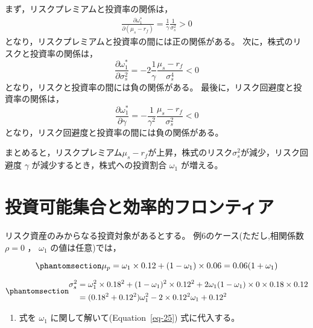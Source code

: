 \documentclass[
  letterpaper,
  pandoc,
  ja=standard,
  jafont = hiragino-pron]{ltjsbook}
\providecommand{\tightlist}{%
  \setlength{\itemsep}{0pt}\setlength{\parskip}{0pt}}\usepackage{longtable,booktabs,array}
\begin{document}
まず，リスクプレミアムと投資率の関係は， \[
\begin{aligned}
\frac{\partial \omega _1^*}{\partial (\mu_s - r_f)} = \frac{1}{\gamma }\frac{1}{\sigma _s^2} > 0
\end{aligned}
\] となり，リスクプレミアムと投資率の間には正の関係がある。
次に，株式のリスクと投資率の関係は， \[
\frac{\partial \omega _1^*}{\partial \sigma ^2_s} = -2 \frac{1}{\gamma }\frac{\mu_s -r_f }{\sigma _s^4} < 0
\] となり，リスクと投資率の間には負の関係がある。
最後に，リスク回避度と投資率の関係は， \[
\frac{\partial \omega _1^*}{\partial \gamma} = - \frac{1}{\gamma^2 }\frac{\mu_s -r_f }{\sigma _s^2} < 0
\] となり，リスク回避度と投資率の間には負の関係がある。

まとめると，リスクプレミアム\(\mu_s-r_f\)が上昇，株式のリスク\(\sigma_s^2\)が減少，リスク回避度
\(\gamma\) が減少するとき，株式への投資割合 \(\omega _1\) が増える。

\section{投資可能集合と効率的フロンティア}\label{ux6295ux8cc7ux53efux80fdux96c6ux5408ux3068ux52b9ux7387ux7684ux30d5ux30edux30f3ux30c6ux30a3ux30a2}

リスク資産のみからなる投資対象があるとする。 例6のケース(ただし,相関係数
\(\rho =0\) ， \(\omega _1\) の値は任意)では，

\begin{equation}\phantomsection\label{eq-24}{
\mu _p = \omega _1 \times 0.12 + (1-\omega _1)\times 0.06 = 0.06(1+\omega _1)
}\end{equation}

\begin{equation}\phantomsection\label{eq-25}{
\begin{aligned}
\sigma_s^2 &= \omega _1^2 \times 0.18^2 +(1-\omega _1)^2 \times 0.12^2 + 2 \omega _1(1-\omega _1) \times 0 \times 0.18 \times 0.12 \nonumber \\
           &=(0.18^2 + 0.12^2)\omega _1^2 - 2 \times 0.12 ^2 \omega _1 + 0.12^2
\end{aligned}
}\end{equation}

\begin{enumerate}
\def\labelenumi{(\arabic{enumi})}
\setcounter{enumi}{1}
\tightlist
\item
  式を \(\omega _1\) に関して解いて(Equation~\ref{eq-25}) 式に代入する。
\end{enumerate}
\end{document}
